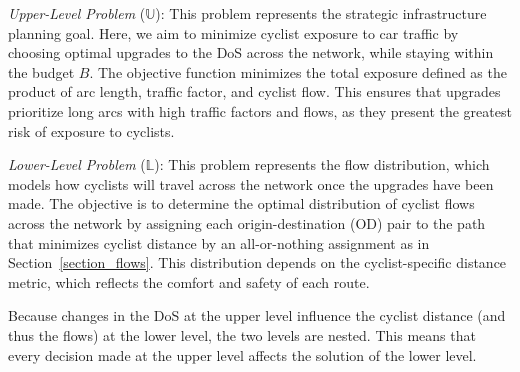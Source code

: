 \documentclass[letterpaper, 10 pt, conference]{ieeeconf}  %
\begin{document}
\textit{Upper-Level Problem} ($\mathbb{U}$): This problem represents the strategic infrastructure planning goal. Here, we aim to minimize cyclist exposure to car traffic by choosing optimal upgrades to the DoS across the network, while staying within the budget $B$. The objective function minimizes the total exposure defined as the product of arc length, traffic factor, and cyclist flow. This ensures that upgrades prioritize long arcs with high traffic factors and flows, as they present the greatest risk of exposure to cyclists.

\textit{Lower-Level Problem} ($\mathbb{L}$): This problem represents the flow distribution, which models how cyclists will travel across the network once the upgrades have been made. The objective is to determine the optimal distribution of cyclist flows across the network by assigning each origin-destination (OD) pair to the path that minimizes cyclist distance by an all-or-nothing assignment as in Section~\ref{section_flows}. This distribution depends on the cyclist-specific distance metric, which reflects the comfort and safety of each route.

Because changes in the DoS at the upper level influence the cyclist distance (and thus the flows) at the lower level, the two levels are nested. This means that every decision made at the upper level affects the solution of the lower level. 
\end{document}
